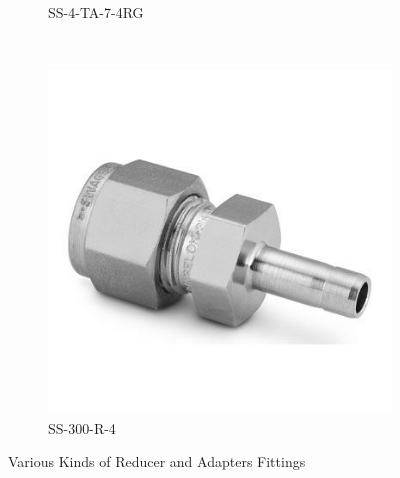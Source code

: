 \documentclass[a4paper,12pt,oneside]{article}
\begin{document}
\begin{appendices}
\begin{figure}[H]
\begin{subfigure}[b]{0.21\textwidth}
    \caption{SS-4-TA-7-4RG}
    \end{subfigure}
    ~
    \begin{subfigure}[b]{0.21\textwidth}
    \centering
    \includegraphics[width=\textwidth]{appendix/img/interfaces/SS-300-R-4.jpg}
    \caption{SS-300-R-4}
    \end{subfigure}
    \caption{Various Kinds of Reducer and Adapters Fittings}
    \label{Appx:Reducer_Adapters_fittings}
\end{figure}


\end{appendices}
\end{document}
